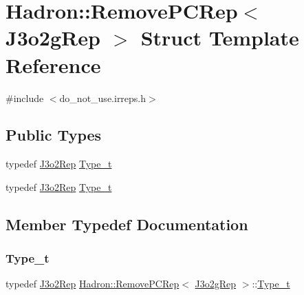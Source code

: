 \hypertarget{structHadron_1_1RemovePCRep_3_01J3o2gRep_01_4}{}\section{Hadron\+:\+:Remove\+P\+C\+Rep$<$ J3o2g\+Rep $>$ Struct Template Reference}
\label{structHadron_1_1RemovePCRep_3_01J3o2gRep_01_4}


{\ttfamily \#include $<$do\+\_\+not\+\_\+use.\+irreps.\+h$>$}

\subsection*{Public Types}
\begin{DoxyCompactItemize}
\item 
typedef \mbox{\hyperlink{structHadron_1_1J3o2Rep}{J3o2\+Rep}} \mbox{\hyperlink{structHadron_1_1RemovePCRep_3_01J3o2gRep_01_4_aa50bb0d4b58454b97bf8e9a4d3eb0a1b}{Type\+\_\+t}}
\item 
typedef \mbox{\hyperlink{structHadron_1_1J3o2Rep}{J3o2\+Rep}} \mbox{\hyperlink{structHadron_1_1RemovePCRep_3_01J3o2gRep_01_4_aa50bb0d4b58454b97bf8e9a4d3eb0a1b}{Type\+\_\+t}}
\end{DoxyCompactItemize}


\subsection{Member Typedef Documentation}
\mbox{\label{structHadron_1_1RemovePCRep_3_01J3o2gRep_01_4_aa50bb0d4b58454b97bf8e9a4d3eb0a1b}} 
\subsubsection{\texorpdfstring{Type\_t}{Type\_t}\hspace{0.1cm}{\footnotesize\ttfamily [1/2]}}
{\footnotesize\ttfamily typedef \mbox{\hyperlink{structHadron_1_1J3o2Rep}{J3o2\+Rep}} \mbox{\hyperlink{structHadron_1_1RemovePCRep}{Hadron\+::\+Remove\+P\+C\+Rep}}$<$ \mbox{\hyperlink{structHadron_1_1J3o2gRep}{J3o2g\+Rep}} $>$\+::\mbox{\hyperlink{structHadron_1_1RemovePCRep_3_01J3o2gRep_01_4_aa50bb0d4b58454b97bf8e9a4d3eb0a1b}{Type\+\_\+t}}}

